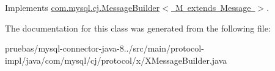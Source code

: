 Implements \mbox{\hyperlink{interfacecom_1_1mysql_1_1cj_1_1_message_builder}{com.\+mysql.\+cj.\+Message\+Builder$<$ M extends Message $>$}}.



The documentation for this class was generated from the following file\+:\begin{DoxyCompactItemize}
\item 
pruebas/mysql-\/connector-\/java-\/8../src/main/protocol-\/impl/java/com/mysql/cj/protocol/x/X\+Message\+Builder.\+java\end{DoxyCompactItemize}
